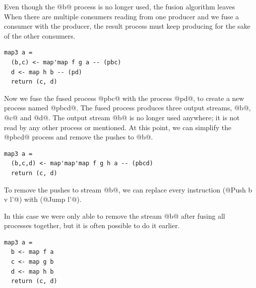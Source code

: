Even though the @b@ process is no longer used, the fusion algorithm leaves 
When there are multiple consumers reading from one producer and we fuse a consumer with the producer, the result process must keep producing for the sake of the other consumers.


\begin{lstlisting}
map3 a =
  (b,c) <- map'map f g a -- (pbc)
  d <- map h b -- (pd)
  return (c, d)
\end{lstlisting}

Now we fuse the fused process @pbc@ with the process @pd@, to create a new process named @pbcd@.
The fused process produces three output streams, @b@, @c@ and @d@.
The output stream @b@ is no longer used anywhere; it is not read by any other process or mentioned.
At this point, we can simplify the @pbcd@ process and remove the pushes to @b@.


\begin{lstlisting}
map3 a =
  (b,c,d) <- map'map'map f g h a -- (pbcd)
  return (c, d)
\end{lstlisting}

To remove the pushes to stream @b@, we can replace every instruction (@Push b v l'@) with (@Jump l'@).

In this case we were only able to remove the stream @b@ after fusing all processes together, but it is often possible to do it earlier.

\begin{lstlisting}
map3 a =
  b <- map f a
  c <- map g b
  d <- map h b
  return (c, d)
\end{lstlisting}





